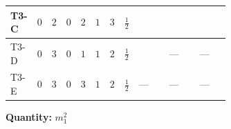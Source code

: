 \documentclass[8pt]{article}
\begin{document}
\begin{landscape}
\begin{longtable}{@{}llcccccc >{\raggedright\arraybackslash}p{0.21\linewidth} >{\raggedright\arraybackslash}p{0.21\linewidth} >{\raggedright\arraybackslash}p{0.21\linewidth}@{}}
\midrule
T3-C & $0$ & $2$ & $0$ & $2$ & $1$ & $3$ & $\frac{1}{2}$ & \scriptsize\adjustbox{max width=\linewidth}{$\begin{gathered} +4 {\lambda_{12}^{(1)}} {m_2^2}\end{gathered}$} & \scriptsize\adjustbox{max width=\linewidth}{$\begin{gathered} +6 {\lambda_{S_1}^{(1)}} {m_1^2}\end{gathered}$} & \scriptsize\adjustbox{max width=\linewidth}{$\begin{gathered} -\frac{9 {g_2}^2 {m_1^2}}{2}\end{gathered}$} \\
\midrule
T3-D & $0$ & $3$ & $0$ & $1$ & $1$ & $2$ & $\frac{1}{2}$ & \scriptsize\adjustbox{max width=\linewidth}{$\begin{gathered} +2 {\lambda_{12}^{(1)}} {m_2^2}\end{gathered}$} & --- & --- \\
\midrule
T3-E & $0$ & $3$ & $0$ & $3$ & $1$ & $2$ & $\frac{1}{2}$ & --- & --- & --- \\
\midrule
\bottomrule
\end{longtable}
\clearpage
\noindent\textbf{Quantity: }$m_1^2$\par\smallskip

\end{landscape}
\end{document}
